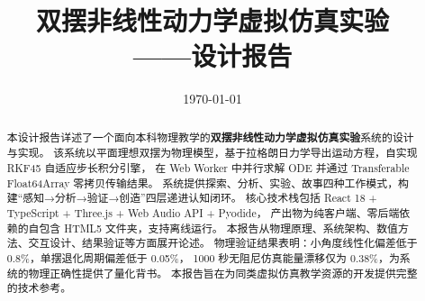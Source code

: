 \documentclass[12pt,a4paper]{ctexart}
\title{\xiaobiaosong 双摆非线性动力学虚拟仿真实验\\[0.5em] \large ——设计报告}
\date{\today}
\author{}
\begin{document}
\maketitle

\begin{abstract}
本设计报告详述了一个面向本科物理教学的\textbf{双摆非线性动力学虚拟仿真实验}系统的设计与实现。
该系统以平面理想双摆为物理模型，基于拉格朗日力学导出运动方程，自实现 RKF45 自适应步长积分引擎，
在 Web Worker 中并行求解 ODE 并通过 Transferable Float64Array 零拷贝传输结果。
系统提供探索、分析、实验、故事四种工作模式，构建“感知→分析→验证→创造”四层递进认知闭环。
核心技术栈包括 React 18 + TypeScript + Three.js + Web Audio API + Pyodide，
产出物为纯客户端、零后端依赖的自包含 HTML5 文件夹，支持离线运行。
本报告从物理原理、系统架构、数值方法、交互设计、结果验证等方面展开论述。
物理验证结果表明：小角度线性化偏差低于 0.8\%，单摆退化周期偏差低于 0.05\%，
1000 秒无阻尼仿真能量漂移仅为 0.38\%，为系统的物理正确性提供了量化背书。
本报告旨在为同类虚拟仿真教学资源的开发提供完整的技术参考。
\end{abstract}

\tableofcontents
\newpage


\clearpage

\clearpage

\clearpage

\clearpage

\clearpage

\clearpage

\end{document}
